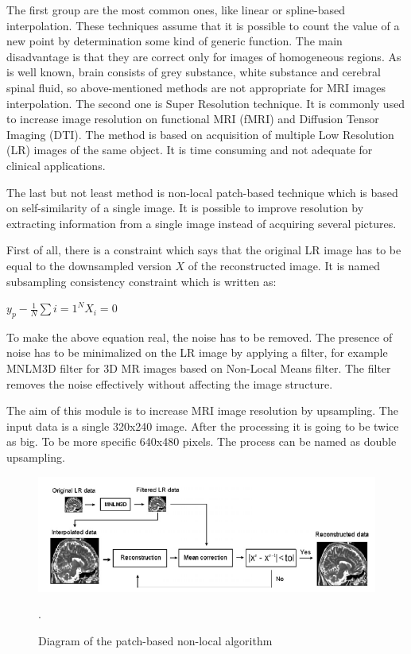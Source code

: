 \begin{enumerate}
The first group are the most common ones, like linear or spline-based
interpolation. These techniques assume that it is possible to count
the value of a new point by determination some kind of generic function.
The main disadvantage is that they are correct only for images of
homogeneous regions. As is well known, brain consists of grey substance,
white substance and cerebral spinal fluid, so above-mentioned methods
are not appropriate for MRI images interpolation. The second one is
Super Resolution technique. It is commonly used to increase image
resolution on functional MRI (fMRI) and Diffusion Tensor Imaging (DTI).
The method is based on acquisition of multiple Low Resolution (LR)
images of the same object. It is time consuming and not adequate for
clinical applications.

The last but not least method is non-local patch-based technique which is based on self-similarity of a single image. It is possible to improve resolution by extracting information from a single image instead of acquiring several pictures.

First of all, there is a constraint which says that the original LR image has to be equal to the downsampled version $X$ of the reconstructed image. It is named subsampling consistency constraint which is written as:
\newline \centerline{$y_{p}-\frac{1}{N}\sum{i=1}^{N}X_{i}=0$}
\newline
\newline To make the above equation real, the noise has to be removed. The presence of noise has to be minimalized on the LR image by applying a filter, for example MNLM3D filter for 3D MR images based on Non-Local Means filter. The filter removes the noise effectively without affecting the image structure. 


The aim of this module is to increase MRI image resolution by upsampling.
The input data is a single 320x240 image. After the processing it
is going to be twice as big. To be more specific 640x480 pixels. The
process can be named as double upsampling.

\begin{figure}[H]
\centering{}\includegraphics[scale=0.7]{figures/Module_10/Module10_1}\caption{Diagram of the patch-based non-local algorithm \cite{9art1}}. 
\label{fig: Module9_1}
\end{figure}


\end{enumerate}
